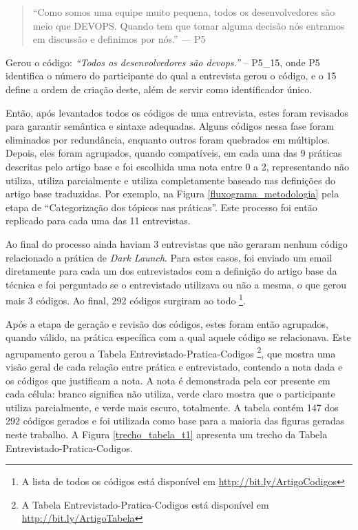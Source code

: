 \begin{quote}
    ``Como somos uma equipe muito pequena, todos os desenvolvedores são meio que DEVOPS. Quando tem que tomar alguma decisão nós entramos em discussão e definimos por nós.'' --- P5
\end{quote}

Gerou o código: \emph{``Todos os desenvolvedores são devops.''} -- P5\_15, onde P5 identifica o número do participante do qual a entrevista gerou o código, e o 15 define a ordem de criação deste, além de servir como identificador único.

Então, após levantados todos os códigos de uma entrevista, estes foram revisados para garantir semântica e sintaxe adequadas. Alguns códigos nessa fase foram eliminados por redundância, enquanto outros foram quebrados em múltiplos. Depois, eles foram agrupados, quando compatíveis, em cada uma das 9 práticas descritas pelo artigo base e foi escolhida uma nota entre 0 a 2, representando não utiliza, utiliza parcialmente e utiliza completamente baseado nas definições do artigo base traduzidas. Por exemplo, na Figura \ref{fluxograma_metodologia} pela etapa de ``Categorização dos tópicos nas práticas''. Este processo foi então replicado para cada uma das 11 entrevistas.

Ao final do processo ainda haviam 3 entrevistas que não geraram nenhum código relacionado a prática de \emph{Dark Launch}. Para estes casos, foi enviado um email diretamente para cada um dos entrevistados com a definição do artigo base da técnica e foi perguntado se o entrevistado utilizava ou não a mesma, o que gerou mais 3 códigos. Ao final, 292 códigos surgiram ao todo \footnote{A lista de todos os códigos está disponível em \url{http://bit.ly/ArtigoCodigos}}.

Após a etapa de geração e revisão dos códigos, estes foram então agrupados, quando válido, na prática específica com a qual aquele código se relacionava. Este agrupamento gerou a Tabela Entrevistado-Pratica-Codigos \footnote{A Tabela Entrevistado-Pratica-Codigos está disponível em \url{http://bit.ly/ArtigoTabela}}, que mostra uma visão geral de cada relação entre prática e entrevistado, contendo a nota dada e os códigos que justificam a nota. A nota é demonstrada pela cor presente em cada célula: branco significa não utiliza, verde claro mostra que o participante utiliza parcialmente, e verde mais escuro, totalmente. A tabela contém 147 dos 292 códigos gerados e foi utilizada como base para a maioria das figuras geradas neste trabalho. A Figura \ref{trecho_tabela_t1} apresenta um trecho da Tabela Entrevistado-Pratica-Codigos.

